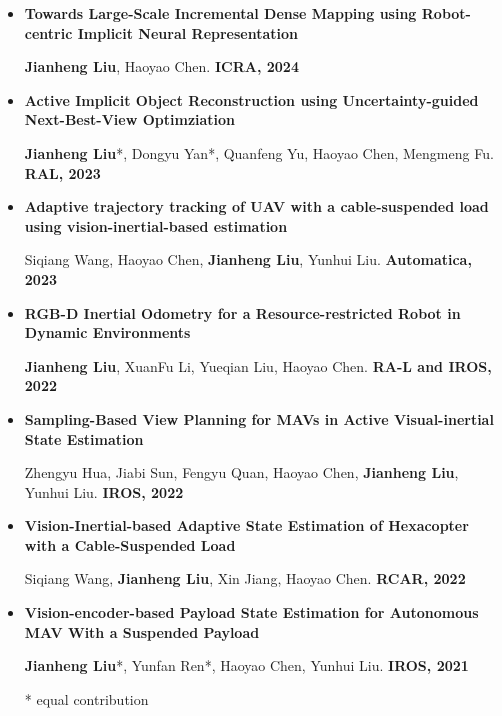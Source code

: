 \documentclass[11pt,a4paper,sans]{moderncv}        %
\begin{document}
\begin{itemize}

    \item{\textbf{Towards Large-Scale Incremental Dense Mapping using Robot-centric Implicit Neural Representation}

    \small{\textbf{Jianheng Liu}, Haoyao Chen. \textbf{ICRA, 2024}}
    }
    
    \vspace{3pt}

    \item{\textbf{Active Implicit Object Reconstruction using Uncertainty-guided Next-Best-View Optimziation}

    \small{\textbf{Jianheng Liu}*, Dongyu Yan*, Quanfeng Yu, Haoyao Chen, Mengmeng Fu. \textbf{RAL, 2023}}
    }
    
    \vspace{3pt}


    \item{\textbf{Adaptive trajectory tracking of UAV with a cable-suspended load using vision-inertial-based estimation}

    \small{Siqiang Wang, Haoyao Chen, \textbf{Jianheng Liu}, Yunhui Liu. \textbf{Automatica, 2023}}
    }
    
    \vspace{3pt}

    \item{\textbf{RGB-D Inertial Odometry for a Resource-restricted Robot in Dynamic Environments}

    \small{\textbf{Jianheng Liu}, XuanFu Li, Yueqian Liu, Haoyao Chen. \textbf{RA-L and IROS, 2022}}
    }

    \vspace{3pt}

    \item{\textbf{Sampling-Based View Planning for MAVs in Active Visual-inertial State Estimation}

    \small{Zhengyu Hua, Jiabi Sun, Fengyu Quan, Haoyao Chen, \textbf{Jianheng Liu}, Yunhui Liu. \textbf{IROS, 2022}}
    }

    \vspace{3pt}

    
    \item{\textbf{Vision-Inertial-based Adaptive State Estimation of Hexacopter with a Cable-Suspended Load}

    \small{Siqiang Wang, \textbf{Jianheng Liu}, Xin Jiang, Haoyao Chen. \textbf{RCAR, 2022}}
    }

    \vspace{3pt}
    

    \item{\textbf{Vision-encoder-based Payload State Estimation for Autonomous MAV With a Suspended Payload}

    \small{\textbf{Jianheng Liu}*, Yunfan Ren*, Haoyao Chen, Yunhui Liu. \textbf{IROS, 2021}}
    }

\footnotesize{* equal contribution}

\end{itemize}
\end{document}
